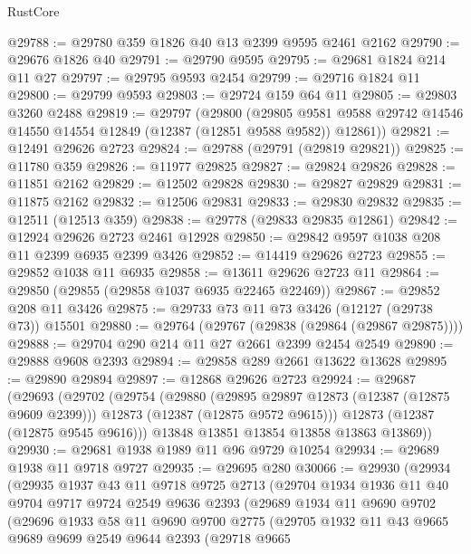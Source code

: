 \begin{lexlean}{RustCore}
\begin{coremodule}
@29788 := @29780 @359 @1826 @40 @13 @2399 @9595 @2461 @2162
@29790 := @29676 @1826 @40
@29791 := @29790 @9595
@29795 := @29681 @1824 @214 @11 @27
@29797 := @29795 @9593 @2454
@29799 := @29716 @1824 @11
@29800 := @29799 @9593
@29803 := @29724 @159 @64 @11
@29805 := @29803 @3260 @2488
@29819 := @29797
    (@29800
      (@29805 @9581 @9588 @29742 @14546 @14550 @14554 @12849 (@12387 (@12851 @9588 @9582)) @12861))
@29821 := @12491 @29626 @2723
@29824 := @29788 (@29791 (@29819 @29821))
@29825 := @11780 @359
@29826 := @11977 @29825
@29827 := @29824 @29826
@29828 := @11851 @2162
@29829 := @12502 @29828
@29830 := @29827 @29829
@29831 := @11875 @2162
@29832 := @12506 @29831
@29833 := @29830 @29832
@29835 := @12511 (@12513 @359)
@29838 := @29778 (@29833 @29835 @12861)
@29842 := @12924 @29626 @2723 @2461 @12928
@29850 := @29842 @9597 @1038 @208 @11 @2399 @6935 @2399 @3426
@29852 := @14419 @29626 @2723
@29855 := @29852 @1038 @11 @6935
@29858 := @13611 @29626 @2723 @11
@29864 := @29850 (@29855 (@29858 @1037 @6935 @22465 @22469))
@29867 := @29852 @208 @11 @3426
@29875 := @29733 @73 @11 @73 @3426 (@12127 (@29738 @73)) @15501
@29880 := @29764 (@29767 (@29838 (@29864 (@29867 @29875))))
@29888 := @29704 @290 @214 @11 @27 @2661 @2399 @2454 @2549
@29890 := @29888 @9608 @2393
@29894 := @29858 @289 @2661 @13622 @13628
@29895 := @29890 @29894
@29897 := @12868 @29626 @2723
@29924 := @29687
    (@29693
      (@29702
        (@29754
          (@29880
            (@29895 @29897 @12873 (@12387 (@12875 @9609 @2399)))
            @12873
            (@12387 (@12875 @9572 @9615)))
          @12873
          (@12387 (@12875 @9545 @9616)))
        @13848
        @13851
        @13854
        @13858
        @13863
        @13869))
@29930 := @29681 @1938 @1989 @11 @96 @9729 @10254
@29934 := @29689 @1938 @11 @9718 @9727
@29935 := @29695 @280
@30066 := @29930
    (@29934
      (@29935
        @1937
        @43
        @11
        @9718
        @9725
        @2713
        (@29704
          @1934
          @1936
          @11
          @40
          @9704
          @9717
          @9724
          @2549
          @9636
          @2393
          (@29689
            @1934
            @11
            @9690
            @9702
            (@29696
              @1933
              @58
              @11
              @9690
              @9700
              @2775
              (@29705
                @1932
                @11
                @43
                @9665
                @9689
                @9699
                @2549
                @9644
                @2393
                (@29718
                  @9665

\end{coremodule}
\end{lexlean}
